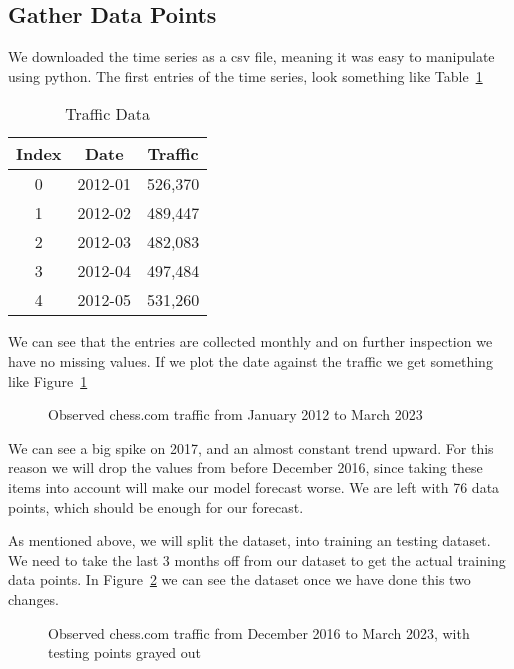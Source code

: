 \documentclass[journal]{IEEEtran}
\begin{document}
\subsection{Gather Data Points}

We downloaded the time series as a csv file, meaning it was easy to manipulate
using python. The first entries of the time series, look something like
Table~\ref{tab:traffic}

\begin{table}[htbp]
  \centering
  \caption{Traffic Data}
  \label{tab:traffic}
  \begin{tabular}{|c|c|c|}
    \hline
    Index & Date & Traffic \\
    \hline
    0 & 2012-01 & 526,370 \\
    1 & 2012-02 & 489,447 \\
    2 & 2012-03 & 482,083 \\
    3 & 2012-04 & 497,484 \\
    4 & 2012-05 & 531,260 \\
    \hline
  \end{tabular}
\end{table}

We can see that the entries are collected monthly and on further inspection we
have no missing values. If we plot the date against the traffic we get
something like Figure~\ref{fig:obs}

\begin{figure}[htbp]
  \centering
  
    \caption{Observed chess.com traffic from January 2012 to March 2023}
  \label{fig:obs}
\end{figure}

We can see a big spike on 2017, and an almost constant trend upward. For this
reason we will drop the values from before December 2016, since taking these
items into account will make our model forecast worse. We are left with 76
data points, which should be enough for our forecast.

As mentioned above, we will split the dataset, into training an testing
dataset. We need to take the last 3 months off from our dataset to get the
actual training data points. In Figure~\ref{fig:obs-2} we can see the dataset
once we have done this two changes.

\begin{figure}[htbp]
  \centering
  
    \caption{Observed chess.com traffic from December 2016 to March 2023, with
        testing points grayed out}
    \label{fig:obs-2}
\end{figure}
\end{document}
